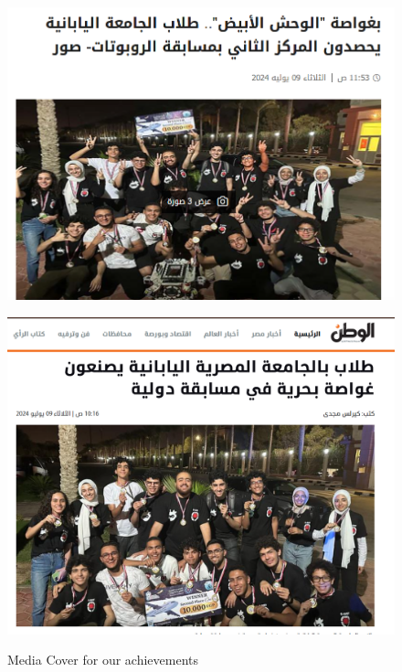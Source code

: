 \documentclass[11pt, twocolumn]{article}
\begin{document}
\begin{figure}[h]
    \centering
    \begin{minipage}{0.46\textwidth}
        \centering
        \includegraphics[width=\textwidth]{Images/Masrawy.png}
        
        \label{fig:figure1}
    \end{minipage}
    \hfill
    \begin{minipage}{0.44\textwidth}
        \centering
        \includegraphics[width=\textwidth]{Images/Elwatan news.png}
      
        \label{fig:figure2}
    \end{minipage}
    \caption{Media Cover for our achievements }
    \label{fig:both_figures}
\end{figure}
\end{document}
